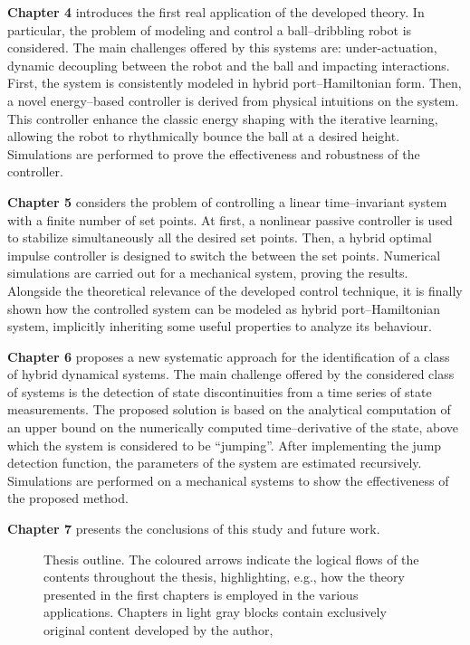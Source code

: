 %
\textbf{Chapter 4} introduces the first real application of the developed theory. In particular, the problem of modeling and control a ball--dribbling robot is considered. The main challenges offered by this systems are: under-actuation, dynamic decoupling between the robot and the ball and impacting interactions. First, the system is consistently modeled in hybrid port--Hamiltonian form. Then, a novel energy--based controller is derived from physical intuitions on the system. This controller enhance the classic energy shaping with the iterative learning, allowing the robot to rhythmically bounce the ball at a desired height. Simulations are performed to prove the effectiveness and robustness of the controller.   
%
\newline

%
\textbf{Chapter 5} considers the problem of controlling a linear time--invariant system with a finite number of set points. At first, a nonlinear passive controller is used to stabilize simultaneously all the desired set points. Then, a hybrid optimal impulse controller is designed to switch the between the set points. Numerical simulations are carried out for a mechanical system, proving the results. Alongside the theoretical relevance of the developed control technique, it is finally shown how the controlled system can be modeled as hybrid port--Hamiltonian system, implicitly inheriting some useful properties to analyze its behaviour.
%
\newline

%
\textbf{Chapter 6} proposes a new systematic approach for the identification of a class of hybrid dynamical systems. The main challenge offered by the considered class of systems is the detection of state discontinuities from a time series of state measurements. The proposed solution is based on the analytical computation of an upper bound on the numerically computed time--derivative of the state, above which the system is considered to be ``jumping''. After implementing the jump detection function, the parameters of the system are estimated recursively. Simulations are performed on a mechanical systems to show the effectiveness of the proposed method.
\newline

%
\textbf{Chapter 7} presents the conclusions of this study and future work.
%
\begin{figure}[b]
    \centering
    
    \vspace{5mm}
    \caption[Thesis outline.]{Thesis outline. The coloured arrows indicate the logical flows of the contents throughout the thesis, highlighting, e.g., how the theory presented in the first chapters is employed in the various applications. Chapters in light gray blocks contain exclusively original content developed by the author,}
    \label{fig:ThesisStructure}
\end{figure}
%
%
%
